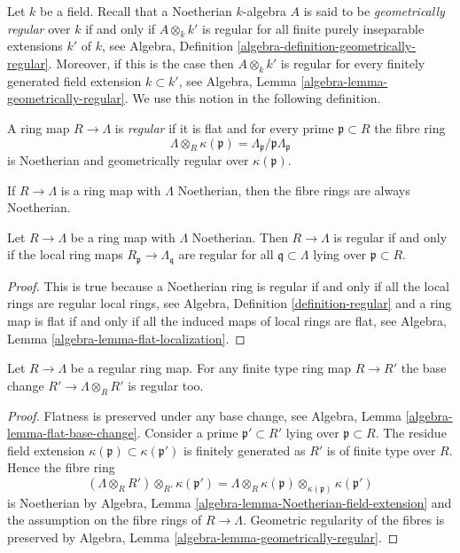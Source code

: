 \noindent
Let $k$ be a field. Recall that a Noetherian $k$-algebra $A$ is
said to be {\it geometrically regular} over $k$ if and only if
$A \otimes_k k'$ is regular for all finite purely inseparable
extensions $k'$ of $k$, see
Algebra, Definition \ref{algebra-definition-geometrically-regular}.
Moreover, if this is the case then $A \otimes_k k'$ is regular
for every finitely generated field extension $k \subset k'$, see
Algebra, Lemma \ref{algebra-lemma-geometrically-regular}.
We use this notion in the following definition.

\begin{definition}
\label{definition-regular}
A ring map $R \to \Lambda$ is {\it regular} if it is flat and
for every prime $\mathfrak p \subset R$ the fibre ring
$$
\Lambda \otimes_R \kappa(\mathfrak p) =
\Lambda_\mathfrak p/\mathfrak p\Lambda_\mathfrak p
$$
is Noetherian and geometrically regular over $\kappa(\mathfrak p)$.
\end{definition}

\noindent
If $R \to \Lambda$ is a ring map with $\Lambda$ Noetherian, then the
fibre rings are always Noetherian.

\begin{lemma}
\label{lemma-regular-local}
Let $R \to \Lambda$ be a ring map with $\Lambda$ Noetherian.
Then $R \to \Lambda$ is regular if and only if the local ring maps
$R_\mathfrak p \to \Lambda_\mathfrak q$ are regular for all
$\mathfrak q \subset \Lambda$ lying over $\mathfrak p \subset R$.
\end{lemma}

\begin{proof}
This is true because a Noetherian ring is regular if and only if
all the local rings are regular local rings, see
Algebra, Definition \ref{definition-regular}
and a ring map is flat if and only if all the induced maps of local
rings are flat, see
Algebra, Lemma \ref{algebra-lemma-flat-localization}.
\end{proof}

\begin{lemma}
\label{lemma-regular-base-change}
Let $R \to \Lambda$ be a regular ring map.
For any finite type ring map $R \to R'$ the base change
$R' \to \Lambda \otimes_R R'$ is regular too.
\end{lemma}

\begin{proof}
Flatness is preserved under any base change, see
Algebra, Lemma \ref{algebra-lemma-flat-base-change}.
Consider a prime $\mathfrak p' \subset R'$ lying over
$\mathfrak p \subset R$. The residue field extension
$\kappa(\mathfrak p) \subset \kappa(\mathfrak p')$ is
finitely generated as $R'$ is of finite type over $R$.
Hence the fibre ring
$$
(\Lambda \otimes_R R') \otimes_{R'} \kappa(\mathfrak p') =
\Lambda \otimes_R \kappa(\mathfrak p) \otimes_{\kappa(\mathfrak p)} 
\kappa(\mathfrak p')
$$
is Noetherian by
Algebra, Lemma \ref{algebra-lemma-Noetherian-field-extension}
and the assumption on the fibre rings of $R \to \Lambda$.
Geometric regularity of the fibres is preserved by
Algebra, Lemma \ref{algebra-lemma-geometrically-regular}.
\end{proof}


